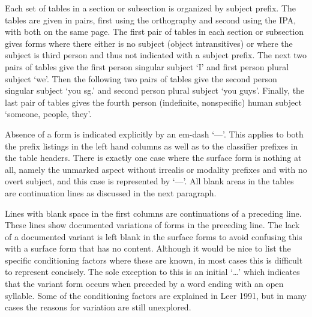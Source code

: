 \documentclass[12pt,letterpaper,landscape,oneside,article]{memoir}
\begin{document}
\begin{multicols}{2}
Each set of tables in a section or subsection is organized by subject prefix.
The tables are given in pairs, first using the orthography and second using the IPA, with both on the same page.
The first pair of tables in each section or subsection gives forms where there either is no subject (object intransitives) or where the subject is third person and thus not indicated with a subject prefix.
The next two pairs of tables give the first person singular subject  ‘I’ and first person plural subject  ‘we’.
Then the following two pairs of tables give the second person singular subject  ‘you sg.’ and second person plural subject  ‘you guys’.
Finally, the last pair of tables gives the fourth person (indefinite, nonspecific) human subject  ‘someone, people, they’.

Absence of a form is indicated explicitly by an em-dash ‘—’.
This applies to both the prefix listings in the left hand columns as well as to the classifier prefixes in the table headers.
There is exactly one case where the surface form is nothing at all, namely the unmarked aspect without irrealis or modality prefixes and with no overt subject, and this case is represented by ‘—’.
All blank areas in the tables are continuation lines as discussed in the next paragraph.

Lines with blank space in the first columns are continuations of a preceding line.
These lines show documented variations of forms in the preceding line.
The lack of a documented variant is left blank in the surface forms to avoid confusing this with a surface form that has no content.
Although it would be nice to list the specific conditioning factors where these are known, in most cases this is difficult to represent concisely.
The sole exception to this is an initial ‘…’ which indicates that the variant form occurs when preceded by a word ending with an open syllable.
Some of the conditioning factors are explained in Leer 1991, but in many cases the reasons for variation are still unexplored.




\end{multicols}
\end{document}
